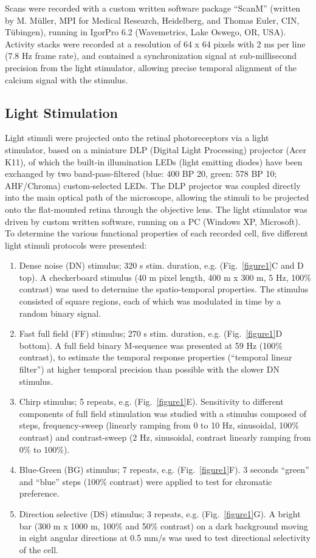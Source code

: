 Scans were recorded with a custom written software package “ScanM” (written by M. Müller, MPI for Medical Research, Heidelberg, and Thomas Euler, CIN, Tübingen), running in IgorPro 6.2 (Wavemetrics, Lake Oswego, OR, USA). Activity stacks were recorded at a resolution of 64 x 64 pixels with 2 ms per line (7.8 Hz frame rate), and contained a synchronization signal at sub-millisecond precision from the light stimulator, allowing precise temporal alignment of the calcium signal with the stimulus.

\subsection{Light Stimulation}
Light stimuli were projected onto the retinal photoreceptors via a light stimulator, based on a miniature DLP (Digital Light Processing) projector (Acer K11), of which the built-in illumination LEDs (light emitting diodes) have been exchanged by two band-pass-filtered (blue: 400 BP 20, green: 578 BP 10; AHF/Chroma) custom-selected LEDs. The DLP projector was coupled directly into the main optical path of the microscope, allowing the stimuli to be projected onto the flat-mounted retina through the objective lens. The light stimulator was driven by custom written software, running on a PC (Windows XP, Microsoft). To determine the various functional properties of each recorded cell, five different light stimuli protocols were presented:

\begin{enumerate}
\item Dense noise (DN) stimulus; 320 s stim. duration, e.g. (Fig.~\ref{figure1}C and D top). A checkerboard stimulus (40 \textmu m pixel length, 400 \textmu m x 300 \textmu m, 5 Hz, 100\% contrast) was used to determine the spatio-temporal properties. The stimulus consisted of square regions, each of which was modulated in time by a random binary signal. 
\item Fast full field (FF) stimulus; 270 s stim. duration, e.g. (Fig.~\ref{figure1}D bottom). A full field binary M-sequence was presented at 59 Hz (100\% contrast), to estimate the temporal response properties (“temporal linear filter”) at higher temporal precision than possible with the slower DN stimulus. 
\item Chirp stimulus; 5 repeats, e.g. (Fig.~\ref{figure1}E).  Sensitivity to different components of full field stimulation was studied with a stimulus composed of steps, frequency-sweep (linearly ramping from 0 to 10 Hz, sinusoidal, 100\% contrast) and contrast-sweep (2 Hz, sinusoidal, contrast linearly ramping from 0\% to 100\%).
\item Blue-Green (BG) stimulus; 7 repeats, e.g. (Fig.~\ref{figure1}F).  3 seconds “green” and “blue” steps (100\% contrast) were applied to test for chromatic preference. 
\item Direction selective (DS) stimulus; 3 repeats, e.g. (Fig.~\ref{figure1}G). A bright bar (300 \textmu m x 1000 \textmu m, 100\% and 50\% contrast) on a dark background moving in eight angular directions at 0.5 mm/s was used to test directional selectivity of the cell.  
\end{enumerate}

